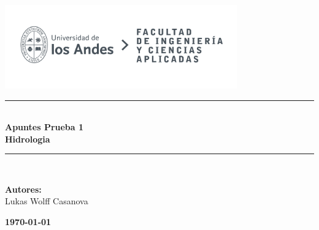 \documentclass{article}  %
\begin{document}
\begin{titlepage}%
\newcommand{\HRule}{\rule{\linewidth}{0.5mm}} 
\center 
\includegraphics[width=10cm]{LOGO_UNIVERSIDAD.jpg}\\ %
\vspace{3cm}
\HRule \\[0.4cm]
{ \huge \bfseries Apuntes Prueba 1}\\[0.4cm] %
{ \huge \bfseries Hidrologia}\\[0.4cm] %
\HRule \\[1.5cm]
 \vspace{5cm}
\begin{flushright}
    { 
    \textbf{Autores:} \\
    Lukas Wolff Casanova\\
}
\end{flushright}
\vspace{1cm}
{\large \textbf{\today}}\\[2cm] %
\end{titlepage}
\newpage
\thispagestyle{empty} %
\tableofcontents
\thispagestyle{plain} %
\thispagestyle{empty} %
\newpage
\end{document}

